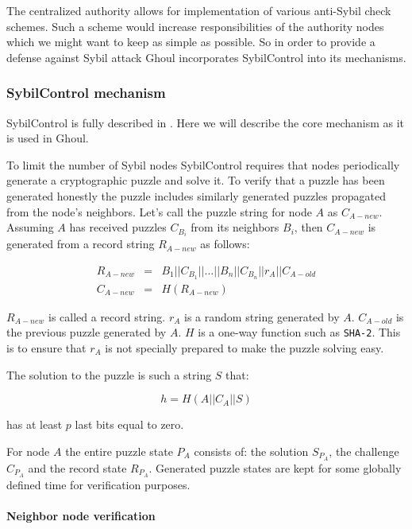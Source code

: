   The centralized authority allows for implementation of various anti-Sybil
  check schemes.
  Such a scheme would increase responsibilities of the authority nodes which we
  might want to keep as simple as possible.
  So in order to provide a defense against Sybil attack Ghoul incorporates
  SybilControl into its mechanisms.

\subsubsection{SybilControl mechanism}
  SybilControl is fully described in \cite{li12}.
  Here we will describe the core mechanism as it is used in Ghoul. 

  To limit the number of Sybil nodes SybilControl requires that nodes
  periodically generate a cryptographic puzzle and solve it. To verify that
  a puzzle has been generated honestly the puzzle includes similarly generated
  puzzles propagated from the node's neighbors.
  Let's call the puzzle string for node $A$ as $C_{A-new}$.
  Assuming $A$ has received puzzles $C_{B_i}$ from its neighbors $B_{i}$, then
  $C_{A-new}$ is generated from a record string $R_{A-new}$ as follows:

  \begin{eqnarray*}
      R_{A-new} &=& B_1||C_{B_1}||\ldots||B_n||C_{B_n}||r_A||C_{A-old}\\
    C_{A-new} &=& H\left(R_{A-new}\right)
  \end{eqnarray*}

  $R_{A-new}$ is called a record string.
  $r_A$ is a random string generated by $A$.
  $C_{A-old}$ is the previous puzzle generated by $A$.
  $H$ is a one-way function such as \texttt{SHA-2}.
  This is to ensure that $r_A$ is not specially prepared to make the puzzle
  solving easy.

  The solution to the puzzle is such a string $S$ that:

  \[ h = H\left(A||C_A||S\right)\]

  has at least $p$ last bits equal to zero.

  For node $A$ the entire puzzle state $P_A$ consists of: the solution
  $S_{P_A}$, the challenge $C_{P_A}$ and the record state $R_{P_A}$.
  Generated puzzle states are kept for some globally defined time for
  verification purposes.

  \paragraph{Neighbor node verification}


